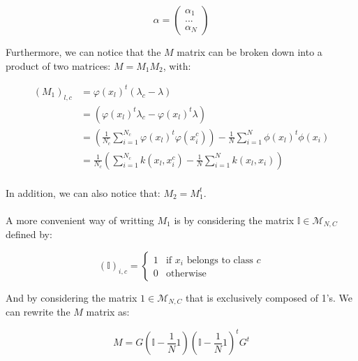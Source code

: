 \begin{equation*}
\alpha = \left( \begin{array}{c}
                                \alpha_1 \\
                                ... \\
                                \alpha_N
                  \end{array}  \right) 
\end{equation*}

Furthermore, we can notice that the $M$ matrix can be broken down into a product of two matrices: $ M = M_1M_2$, with:

\begin{align*}
(M_1)_{l, c} &= \varphi(x_l)^t(\lambda_c - \lambda)\\
             &= (\varphi(x_l)^t\lambda_c -\varphi(x_l)^t\lambda) \\
             &= \left( \frac{1}{N_c} \sum_{i=1}^{N_c} \varphi(x_l)^t\varphi(x_i^c)\right) -
                 \frac{1}{N}\sum_{i=1}^N\phi(x_l)^t\phi(x_i) \\
             &= \frac{1}{N_c} \left(\sum_{i = 1}^{N_c} k(x_l, x_i^c) -
                \frac{1}{N}\sum_{i=1}^N k(x_l, x_i) \right)\\
\end{align*}

In addition, we can also notice that: $M_2 = M_1^t$.

\paragraph{}
A more convenient way of writting $M_1$ is by considering the matrix $\mathbb{I} \in
\mathcal{M}_{N,C}$ defined by:

\begin{equation*}
(\mathbb{I})_{i, c} = \left\{ \begin{array}{ll}
                                  1 & \text{if $x_i$ belongs to class $c$} \\
                                  0 & \text{otherwise}
                               \end{array}
                        \right.
\end{equation*}

And by considering the matrix $1 \in \mathcal{M}_{N,C}$ that is exclusively composed of
1's.
We can rewrite the $M$ matrix as:

\begin{equation*}
M = G\left( \mathbb{I} - \frac{1}{N} 1 \right)\left( \mathbb{I} - \frac{1}{N} 1\right)^tG^t
\end{equation*}

